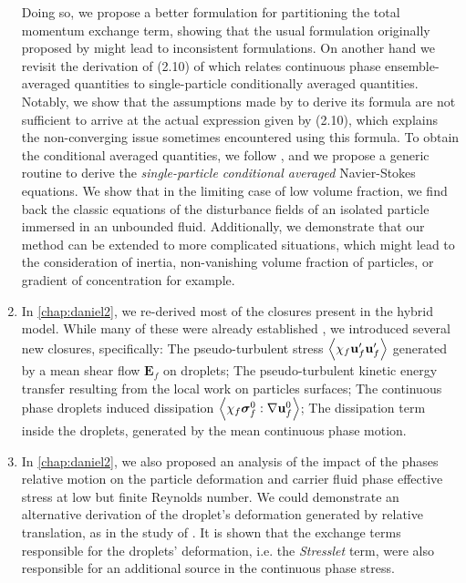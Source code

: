 \begin{enumerate}
    Doing so, we propose a better formulation for partitioning the total momentum exchange term, showing that the usual formulation originally proposed by \citep{zhang1997momentum} might lead to inconsistent formulations. 
    On another hand we revisit the derivation of (2.10) of \citet{batchelor1972sedimentation} which relates continuous phase ensemble-averaged quantities to single-particle conditionally averaged quantities.
    Notably, we show that the assumptions made by \citet{batchelor1972sedimentation} to derive its formula are not sufficient to arrive at the actual expression given by (2.10), which explains the non-converging issue sometimes encountered using this formula. 
    To obtain the conditional averaged quantities, we follow \citet{hinch1977averaged}, and we propose a generic routine to derive the \textit{single-particle conditional averaged} Navier-Stokes equations. 
    We show that in the limiting case of low volume fraction, we find back the classic equations of the disturbance fields of an isolated particle immersed in an unbounded fluid. 
    Additionally, we demonstrate that our method can be extended to more complicated situations, which might lead to the consideration of inertia, non-vanishing volume fraction of particles, or gradient of concentration for example.
    \item In \ref{chap:daniel2}, we re-derived most of the closures present in the hybrid model. 
    While many of these were already established \citep[Appendix A]{zhang1997momentum}, we introduced several new closures, specifically: 
    The pseudo-turbulent stress $\left<\chi_f \textbf{u}_f'\textbf{u}_f'\right>$ generated by a mean shear flow $\textbf{E}_f$ on droplets; 
    The pseudo-turbulent kinetic energy transfer resulting from the local work on particles surfaces; 
    The continuous phase droplets induced dissipation $\left<\chi_f \bm\sigma_f^0:\mathbf{\nabla} \textbf{u}_f^0\right>$; 
    The dissipation term inside the droplets, generated by the mean continuous phase motion. 
    \item In \ref{chap:daniel2}, we also proposed an analysis of the impact of the phases relative motion on the particle deformation and carrier fluid phase effective stress  at low but finite Reynolds number. 
    We could demonstrate an alternative derivation of the droplet's deformation generated by relative translation, as in the study of \citet{taylor1964deformation}. 
    It is shown that the exchange terms responsible for the droplets' deformation, i.e. the \textit{Stresslet} term, were also responsible for an additional source in the continuous phase stress. 

\end{enumerate}
